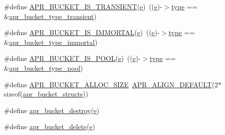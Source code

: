 \begin{DoxyCompactItemize}
\item 
\#define \hyperlink{group__APR__Util__Bucket__Brigades_ga1a7e7ac5fddbab4ce189e8d3007446ff}{A\+P\+R\+\_\+\+B\+U\+C\+K\+E\+T\+\_\+\+I\+S\+\_\+\+T\+R\+A\+N\+S\+I\+E\+NT}(\hyperlink{pcregrep_8txt_acd90314acb2c2e5cd19681136c08efac}{e})~((\hyperlink{pcregrep_8txt_acd90314acb2c2e5cd19681136c08efac}{e})-\/$>$\hyperlink{pcre_8txt_a2463fbbe8b0c90b90db12195e1edaa5d}{type} == \&\hyperlink{group__APR__Util__Bucket__Brigades_ga0445b8ae0f59c8348b2b34dae23531f3}{apr\+\_\+bucket\+\_\+type\+\_\+transient})
\item 
\#define \hyperlink{group__APR__Util__Bucket__Brigades_ga53f1188c168acf7dcfabfa1ac5a08655}{A\+P\+R\+\_\+\+B\+U\+C\+K\+E\+T\+\_\+\+I\+S\+\_\+\+I\+M\+M\+O\+R\+T\+AL}(\hyperlink{pcregrep_8txt_acd90314acb2c2e5cd19681136c08efac}{e})~((\hyperlink{pcregrep_8txt_acd90314acb2c2e5cd19681136c08efac}{e})-\/$>$\hyperlink{pcre_8txt_a2463fbbe8b0c90b90db12195e1edaa5d}{type} == \&\hyperlink{group__APR__Util__Bucket__Brigades_gac254c94d966f069f8942a04ec89f54ae}{apr\+\_\+bucket\+\_\+type\+\_\+immortal})
\item 
\#define \hyperlink{group__APR__Util__Bucket__Brigades_gadbe80a9016da6a06ab414ba61d6625d0}{A\+P\+R\+\_\+\+B\+U\+C\+K\+E\+T\+\_\+\+I\+S\+\_\+\+P\+O\+OL}(\hyperlink{pcregrep_8txt_acd90314acb2c2e5cd19681136c08efac}{e})~((\hyperlink{pcregrep_8txt_acd90314acb2c2e5cd19681136c08efac}{e})-\/$>$\hyperlink{pcre_8txt_a2463fbbe8b0c90b90db12195e1edaa5d}{type} == \&\hyperlink{group__APR__Util__Bucket__Brigades_gaa18a611f4fdb03f35ebc29fbfda55d2f}{apr\+\_\+bucket\+\_\+type\+\_\+pool})
\item 
\#define \hyperlink{group__APR__Util__Bucket__Brigades_gae3ccf4c383c9e7fea28354cc8e029626}{A\+P\+R\+\_\+\+B\+U\+C\+K\+E\+T\+\_\+\+A\+L\+L\+O\+C\+\_\+\+S\+I\+ZE}~\hyperlink{group__apr__general_gab484e98426221f3212fcb67af0467381}{A\+P\+R\+\_\+\+A\+L\+I\+G\+N\+\_\+\+D\+E\+F\+A\+U\+LT}(2$\ast$sizeof(\hyperlink{unionapr__bucket__structs}{apr\+\_\+bucket\+\_\+structs}))
\item 
\#define \hyperlink{group__APR__Util__Bucket__Brigades_gafc0dae1e90a798284ed777a0c9e90ec6}{apr\+\_\+bucket\+\_\+destroy}(\hyperlink{pcregrep_8txt_acd90314acb2c2e5cd19681136c08efac}{e})
\item 
\#define \hyperlink{group__APR__Util__Bucket__Brigades_ga8925c02a7f95e8c1c3986294d4678797}{apr\+\_\+bucket\+\_\+delete}(\hyperlink{pcregrep_8txt_acd90314acb2c2e5cd19681136c08efac}{e})
\item 

\end{DoxyCompactItemize}

